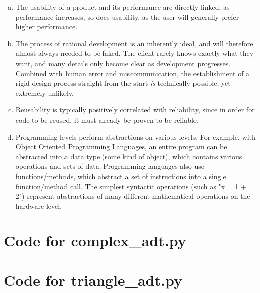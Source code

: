 \documentclass[12pt]{article}
\begin{document}
\begin{enumerate}[(a)]
\item The usability of a product and its performance are directly linked; as performance increases, so does usability, as the user will generally prefer higher performance. 
\item The process of rational development is an inherently ideal, and will therefore almost always needed to be faked. The client rarely knows exactly what they want, and many details only become clear as development progresses. Combined with human error and miscommunication, the establishment of a rigid design process straight from the start \textit{is} technically possible, yet extremely unlikely.
\item Reusability is typically positively correlated with reliability, since in order for code to be reused, it must already be proven to be reliable.
\item Programming levels perform abstractions on various levels. For example, with Object Oriented Programming Languages, an entire program can be abstracted into a data type (some kind of object), which contains various operations and sets of data. Programming languages also use functions/methods, which abstract a set of instructions into a single function/method call. The simplest syntactic operations (such as "x = 1 + 2") represent abstractions of many different mathematical operations on the hardware level.

\end{enumerate}

\newpage

\lstset{language=Python, basicstyle=\tiny, breaklines=true, showspaces=false,
  showstringspaces=false, breakatwhitespace=true}

\def\thesection{\Alph{section}}

\section{Code for complex\_adt.py}

\noindent 

\newpage

\section{Code for triangle\_adt.py}

\noindent 
\end{document}
